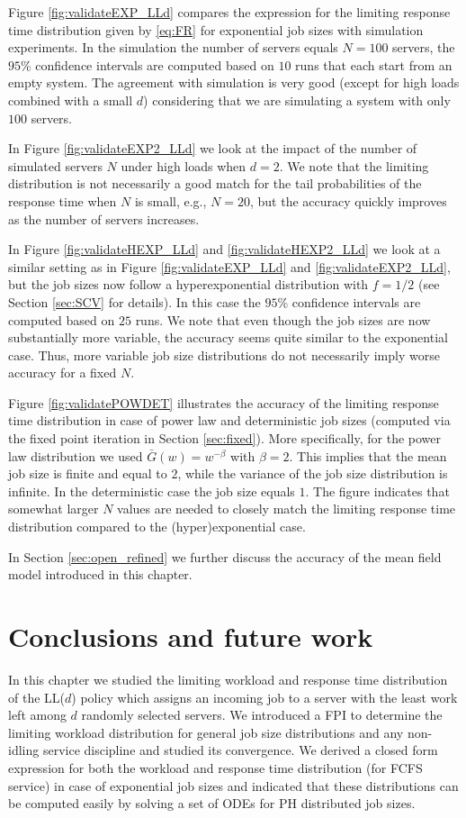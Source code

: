 \documentclass[12pt]{report}
\begin{document}
Figure \ref{fig:validateEXP_LLd} compares the expression for the limiting response time distribution given by
\eqref{eq:FR} for exponential job sizes with simulation experiments. In the simulation the number of servers equals $N=100$
servers, the $95\%$ confidence intervals are computed based on $10$ runs that each start from an empty system. The agreement with simulation is very good
(except for high loads combined with a small $d$) considering that we are simulating a system with only $100$ servers.

In Figure \ref{fig:validateEXP2_LLd} we look at the impact of the number of simulated servers $N$ under high loads
when $d=2$. We note that the limiting distribution is not necessarily a good match for the tail probabilities of the response time
when $N$ is small, e.g., $N=20$, but the accuracy quickly improves as the number of servers increases.

In Figure \ref{fig:validateHEXP_LLd} and \ref{fig:validateHEXP2_LLd} we look at a similar setting as in Figure \ref{fig:validateEXP_LLd} and 
\ref{fig:validateEXP2_LLd}, but the job sizes
now follow a hyperexponential distribution with $f=1/2$ (see Section \ref{sec:SCV} for details).  
In this case the $95\%$ confidence intervals are computed based on $25$
runs. We note that even though the job sizes are now
substantially more variable, the accuracy seems quite similar to the exponential case. Thus, more variable 
job size distributions do not necessarily imply worse accuracy for a fixed $N$.



Figure \ref{fig:validatePOWDET} illustrates the accuracy of the limiting
response time distribution in case of power law and deterministic job sizes
(computed via the fixed point iteration in Section \ref{sec:fixed}).
More specifically, for the power law distribution we used $\bar{G}(w) = w^{-\beta}$ with $\beta=2$.
This implies that the mean job size is finite and equal to $2$, while the variance of the job size distribution
is infinite. In the deterministic case the job size equals $1$. 
The figure indicates that somewhat larger $N$ values are needed to closely match 
the limiting response time distribution compared to the (hyper)exponential case.

In Section \ref{sec:open_refined} we further discuss the accuracy of the mean field model introduced in this chapter.

\section{Conclusions and future work}\label{sec:concl_LLd}
In this chapter we studied the limiting workload and response time distribution 
of the LL($d$) policy which assigns an incoming job to a server with the least work left
among $d$ randomly selected servers. We introduced a FPI to determine the
limiting workload distribution for general job size distributions and any non-idling
service discipline and studied its convergence. We derived a closed form expression for
both the workload and response time distribution (for FCFS service) in case of exponential job sizes and indicated
that these distributions can be computed easily by solving a set of ODEs
for PH distributed job sizes. 
\end{document}
